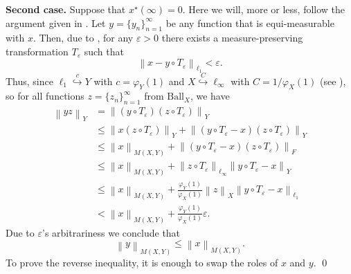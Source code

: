 \documentclass[11pt]{amsart}
\theoremstyle{definition}
\theoremstyle{definition}
\theoremstyle{definition}
\theoremstyle{definition}
\theoremstyle{definition}
\theoremstyle{definition}
\theoremstyle{definition}
\theoremstyle{definition}
\numberwithin{equation}{section}
\numberwithin{equation}{section}
\numberwithin{equation}{section}
\theoremstyle{definition}
\theoremstyle{definition}
\theoremstyle{definition}
\theoremstyle{definition}
\theoremstyle{definition}
\theoremstyle{definition}
\newcommand{\norm}[1]{\left\lVert#1\right\rVert}
\renewenvironment{proof}{\noindent {\bf Proof.}}{\qed}
\begin{document}
\begin{proof}
		{\bf Second case.} Suppose that $x^{\star}(\infty) = 0$. Here we will, more or less, follow the argument given in \cite[Theorem~2.2]{KLM12}.
		Let $y = \{y_n\}_{n=1}^{\infty}$ be any function that is equi-measurable with $x$. Then, due to \cite[Lemma~2.1, p.~60]{KPS82},
		for any $\varepsilon > 0$ there exists a measure-preserving transformation $T_{\varepsilon}$ such that
		\begin{equation*}
			\norm{x - y \circ T_{\varepsilon} }_{\ell_1} < \varepsilon.
		\end{equation*}
		Thus, since $\ell_1 \overset{c}{\hookrightarrow} Y$ with $c = \varphi_Y(1)$ and $X \overset{C}{\hookrightarrow} \ell_{\infty}$ with $C = 1/\varphi_X(1)$
		(see \cite[pp.~77--78]{BS88}), so for all functions $z = \{z_n\}_{n=1}^{\infty}$ from $\text{Ball}_X$, we have
		\begin{align*}
			\norm{yz}_Y
				& = \norm{(y \circ T_{\varepsilon})(z \circ T_{\varepsilon})}_Y \\
				& \leqslant \norm{x(z \circ T_{\varepsilon})}_Y + \norm{\left( y \circ T_{\varepsilon} - x \right)(z \circ T_{\varepsilon})}_Y \\
				& \leqslant \norm{x}_{M(X,Y)} + \norm{\left( y \circ T_{\varepsilon} - x \right)(z \circ T_{\varepsilon})}_F \\
				& \leqslant \norm{x}_{M(X,Y)} + \norm{z \circ T_{\varepsilon}}_{\ell_{\infty}} \norm{y \circ T_{\varepsilon} - x}_Y \\
				& \leqslant \norm{x}_{M(X,Y)} + \frac{\varphi_Y(1)}{\varphi_X(1)}\norm{z}_{X} \norm{y \circ T_{\varepsilon} - x}_{\ell_1} \\
				& < \norm{x}_{M(X,Y)} + \frac{\varphi_Y(1)}{\varphi_X(1)} \varepsilon.
		\end{align*}
		Due to $\varepsilon$'s arbitrariness we conclude that
		\begin{equation*}
			\norm{y}_{M(X,Y)} \leqslant \norm{x}_{M(X,Y)}.
		\end{equation*}
		To prove the reverse inequality, it is enough to swap the roles of $x$ and $y$.
	\end{proof}
		
\end{document}
